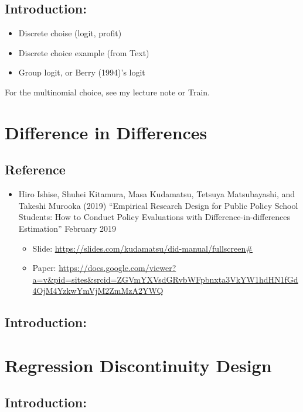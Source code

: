 \documentclass[]{book}
\providecommand{\tightlist}{%
  \setlength{\itemsep}{0pt}\setlength{\parskip}{0pt}}
\begin{document}
\section{Introduction:}\label{introduction-4}

\begin{itemize}
\tightlist
\item
  Discrete choise (logit, profit)
\item
  Discrete choice example (from Text)
\item
  Group logit, or Berry (1994)'s logit
\end{itemize}

For the multinomial choice, see my lecture note or Train.

\chapter{Difference in Differences}\label{difference-in-differences}

\section{Reference}\label{reference}

\begin{itemize}
\tightlist
\item
  Hiro Ishise, Shuhei Kitamura, Masa Kudamatsu, Tetsuya Matsubayashi,
  and Takeshi Murooka (2019) ``Empirical Research Design for Public
  Policy School Students: How to Conduct Policy Evaluations with
  Difference-in-differences Estimation'' February 2019

  \begin{itemize}
  \tightlist
  \item
    Slide: \url{https://slides.com/kudamatsu/did-manual/fullscreen\#}\\
  \item
    Paper:
    \url{https://docs.google.com/viewer?a=v\&pid=sites\&srcid=ZGVmYXVsdGRvbWFpbnxta3VkYW1hdHN1fGd4OjM4YzkwYmVjM2ZmMzA2YWQ}
  \end{itemize}
\end{itemize}

\section{Introduction:}\label{introduction-5}

\chapter{Regression Discontinuity
Design}\label{regression-discontinuity-design}

\section{Introduction:}\label{introduction-6}
\end{document}

